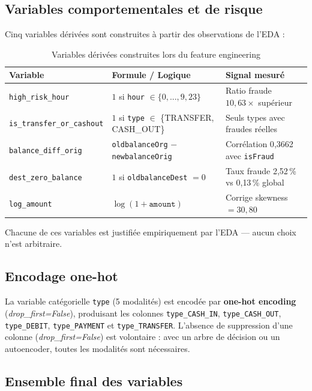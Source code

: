 \subsection{Variables comportementales et de risque}

Cinq variables dérivées sont construites à partir des observations de l'EDA :

\begin{table}[H]
\centering
\caption{Variables dérivées construites lors du feature engineering}
\label{tab:features_derivees}
\begin{tabular}{p{3.5cm}p{4.5cm}p{4cm}}
\toprule
\textbf{Variable} & \textbf{Formule / Logique} & \textbf{Signal mesuré} \\
\midrule
\texttt{high\_risk\_hour} &
  $1$ si \texttt{hour} $\in \{0,...,9, 23\}$ &
  Ratio fraude $10{,}63\times$ supérieur \\[0.2cm]
\texttt{is\_transfer\_or\_cashout} &
  $1$ si \texttt{type} $\in$ \{TRANSFER, CASH\_OUT\} &
  Seuls types avec fraudes réelles \\[0.2cm]
\texttt{balance\_diff\_orig} &
  \texttt{oldbalanceOrg} $-$ \texttt{newbalanceOrig} &
  Corrélation 0{,}3662 avec \texttt{isFraud} \\[0.2cm]
\texttt{dest\_zero\_balance} &
  $1$ si \texttt{oldbalanceDest} $= 0$ &
  Taux fraude 2{,}52\,\% vs 0{,}13\,\% global \\[0.2cm]
\texttt{log\_amount} &
  $\log(1 + \texttt{amount})$ &
  Corrige skewness $= 30{,}80$ \\
\bottomrule
\end{tabular}
\end{table}

Chacune de ces variables est justifiée empiriquement par l'EDA --- aucun choix n'est
arbitraire.

\subsection{Encodage one-hot}

La variable catégorielle \texttt{type} (5 modalités) est encodée par
\textbf{one-hot encoding} (\textit{drop\_first=False}), produisant les colonnes
\texttt{type\_CASH\_IN}, \texttt{type\_CASH\_OUT}, \texttt{type\_DEBIT},
\texttt{type\_PAYMENT} et \texttt{type\_TRANSFER}. L'absence de suppression d'une
colonne (\textit{drop\_first=False}) est volontaire : avec un arbre de décision ou un
autoencoder, toutes les modalités sont nécessaires.

\subsection{Ensemble final des variables}

